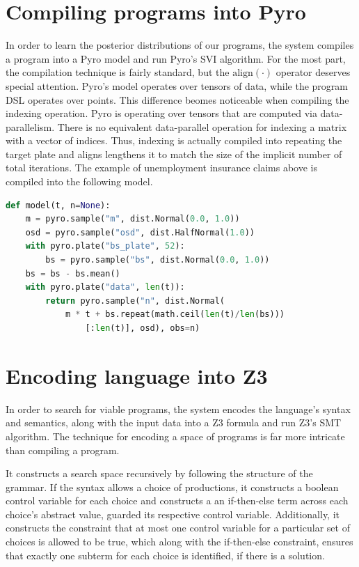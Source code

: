 \documentclass[runningheads]{llncs}
\begin{document}
\section{Compiling programs into Pyro}
In order to learn the posterior distributions of our programs, the system compiles a program into  
a Pyro model and run Pyro's SVI algorithm. For the most part, the compilation technique
is fairly standard, but the $\text{align}(\cdot)$ operator deserves special attention. 
Pyro's model operates over tensors of data, while the program DSL operates over points. 
This difference beomes noticeable when compiling the indexing operation. Pyro is
operating over tensors that are computed via data-parallelism. There is no
equivalent data-parallel operation for indexing a matrix with a vector of indices.
Thus, indexing is actually compiled into repeating the target plate and aligns lengthens it
to match the size of the implicit number of total iterations.    
The example of unemployment insurance claims above is compiled into the following model.

\begin{lstlisting}[language=Python]
def model(t, n=None):
    m = pyro.sample("m", dist.Normal(0.0, 1.0))
    osd = pyro.sample("osd", dist.HalfNormal(1.0))
    with pyro.plate("bs_plate", 52):
        bs = pyro.sample("bs", dist.Normal(0.0, 1.0))
    bs = bs - bs.mean()
    with pyro.plate("data", len(t)):
        return pyro.sample("n", dist.Normal(
            m * t + bs.repeat(math.ceil(len(t)/len(bs)))
                [:len(t)], osd), obs=n)
\end{lstlisting}


\section{Encoding language into Z3}
In order to search for viable programs, the system encodes the language's syntax and semantics, 
along with the input data into a Z3 formula and run Z3's SMT algorithm.
The technique for encoding a space of programs is far more intricate than compiling a program.

It constructs a search space recursively by following the structure of the grammar. 
If the syntax allows a choice of productions, it constructs a boolean control variable for each choice
and constructs a an if-then-else term across each choice's abstract value, guarded its respective control variable. 
Additionally, it constructs the constraint that at most one control variable for a particular set of choices    
is allowed to be true, which along with the if-then-else constraint, ensures
that exactly one subterm for each choice is identified, if there is a solution.  
\end{document}

